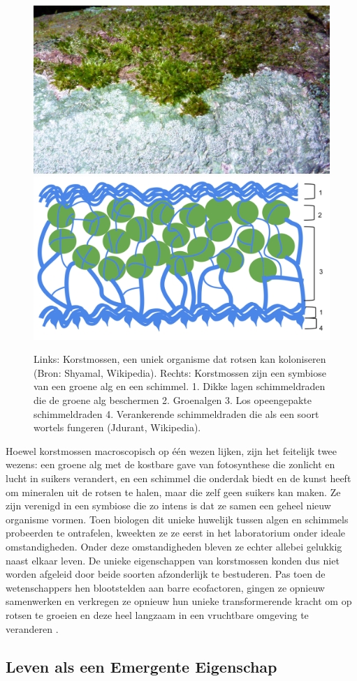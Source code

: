 \documentclass[
  11pt,
]{book}
\begin{document}
\begin{figure}

{\centering \includegraphics[width=0.45\linewidth]{./figs/lichen} \includegraphics[width=0.45\linewidth]{./figs/LichenDiagram} 

}

\caption{Links: Korstmossen, een uniek organisme dat rotsen kan koloniseren (Bron: Shyamal, Wikipedia). Rechts: Korstmossen zijn een symbiose van een groene alg en een schimmel. 1. Dikke lagen schimmeldraden die de groene alg beschermen 2. Groenalgen 3. Los opeengepakte schimmeldraden 4. Verankerende schimmeldraden die als een soort wortels fungeren (Jdurant, Wikipedia).}\label{fig:lichen}
\end{figure}

Hoewel korstmossen macroscopisch op één wezen lijken, zijn het feitelijk twee wezens: een groene alg met de kostbare gave van fotosynthese die zonlicht en lucht in suikers verandert, en een schimmel die onderdak biedt en de kunst heeft om mineralen uit de rotsen te halen, maar die zelf geen suikers kan maken. Ze zijn verenigd in een symbiose die zo intens is dat ze samen een geheel nieuw organisme vormen. Toen biologen dit unieke huwelijk tussen algen en schimmels probeerden te ontrafelen, kweekten ze ze eerst in het laboratorium onder ideale omstandigheden. Onder deze omstandigheden bleven ze echter allebei gelukkig naast elkaar leven. De unieke eigenschappen van korstmossen konden dus niet worden afgeleid door beide soorten afzonderlijk te bestuderen. Pas toen de wetenschappers hen blootstelden aan barre ecofactoren, gingen ze opnieuw samenwerken en verkregen ze opnieuw hun unieke transformerende kracht om op rotsen te groeien en deze heel langzaam in een vruchtbare omgeving te veranderen \citep{Kimmerer2013}.

\hypertarget{leven-als-een-emergente-eigenschap}{%
\subsection{Leven als een Emergente Eigenschap}\label{leven-als-een-emergente-eigenschap}}
\end{document}
